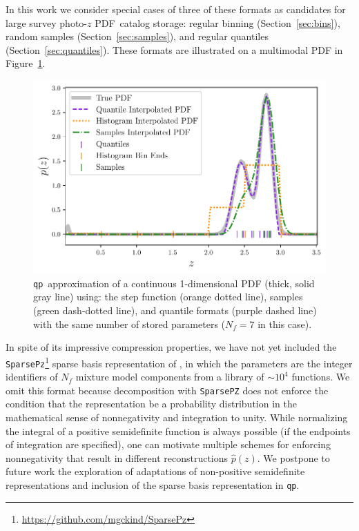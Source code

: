 \documentclass[\docopts]{\docclass}
\newcommand{\qp}{\texttt{qp}}
\newcommand{\pz}{photo-$z$ PDF}
\begin{document}
In this work we consider special cases of three of these formats as candidates 
for large survey \pz\ catalog storage: regular binning 
(Section~\ref{sec:bins}), random samples (Section~\ref{sec:samples}), and 
regular quantiles (Section~\ref{sec:quantiles}).
These formats are illustrated on a multimodal PDF in Figure~\ref{fig:qp}.
\begin{figure}
  \begin{center}
    \includegraphics[width=\columnwidth]{figures/demo_pz.pdf}
    \caption{\qp\ approximation of a continuous 1-dimensional PDF (thick, solid 
gray line) using: the step function (orange dotted line), samples (green 
dash-dotted line), and quantile formats (purple dashed line) with the same 
number of stored parameters ($N_{f}=7$ in this case).
    \label{fig:qp}}
  \end{center}
\end{figure}

In spite of its impressive compression properties, we have not yet included the 
\texttt{SparsePz}\footnote{\url{https://github.com/mgckind/SparsePz}} sparse 
basis representation of \citet{carrasco_kind_sparse_2014}, in which the 
parameters are the integer identifiers of $N_{f}$ mixture model components from 
a library of $\sim10^{4}$ functions.
We omit this format because decomposition with \texttt{SparsePZ} does not 
enforce the condition that the representation be a probability distribution in 
the mathematical sense of nonnegativity and integration to unity.
While normalizing the integral of a positive semidefinite function is always 
possible (if the endpoints of integration are specified), one can motivate 
multiple schemes for enforcing nonnegativity that result in different 
reconstructions $\hat{p}(z)$.
We postpone to future work the exploration of adaptations of non-positive 
semidefinite representations and inclusion of the sparse basis representation 
in \qp.
\end{document}
